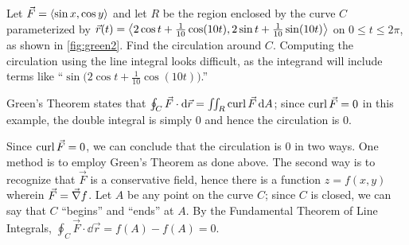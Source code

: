 \begin{example}\label{ex_green2}%
%
%
Let $\vec F =\left\langle \sin x,\cos y\right\rangle$ and let $R$ be the region enclosed by the curve $C$ parameterized by $\vec r(t) =\left\langle 2\cos t+ \frac1{10}\cos(10t),2\sin t+\frac1{10}\sin(10t)\right\rangle$ on $0\leq t\leq 2\pi$, as shown in \autoref{fig:green2}. Find the circulation around $C$.
\solution
Computing the circulation using the line integral looks difficult, as the integrand will include terms like ``$\sin\bigl(2\cos t + \frac1{10}\cos(10t)\bigr)$.'' 

Green's Theorem states that $\oint_C\vec F\cdot\operatorname{d}\!\vec r = \iint_R \operatorname{curl}\vec F\operatorname{d}\! A$; since $\operatorname{curl} \vec F = 0$ in this example, the double integral is simply 0 and hence the circulation is 0.

Since $\operatorname{curl} \vec F = 0$, we can conclude that the circulation is 0 in two ways. One method is to employ Green's Theorem as done above. The second way is to recognize that $\vec F$ is a conservative field, hence there is a function $z=f(x,y)$ wherein $\vec F = \vec\nabla f$. Let $A$ be any point on the curve $C$; since $C$ is closed, we can say that $C$ ``begins'' and ``ends'' at $A$. By the Fundamental Theorem of Line Integrals, $\oint_C \vec F\cdot\dd\vec r = f(A)-f(A) = 0$.
\end{example}

